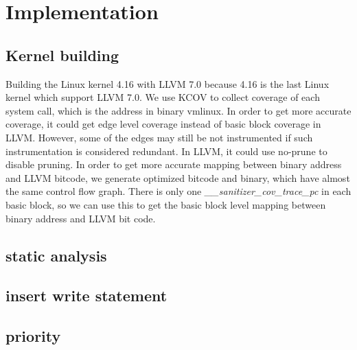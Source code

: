 \section{Implementation}

\subsection{Kernel building}


Building the Linux kernel 4.16 with LLVM 7.0 because 4.16 is the last Linux kernel which support LLVM 7.0.
We use KCOV to collect coverage of each system call,  which is the address in binary vmlinux.
In order to get more accurate coverage, it could get edge level coverage instead of basic block coverage in LLVM.
However, some of the edges may still be not instrumented if such instrumentation is considered redundant.
In LLVM, it could use no-prune to disable pruning.
In order to get more accurate mapping between binary address and LLVM bitcode, we generate optimized bitcode and binary, which have almost the same control flow graph.
There is only one \textit{\_\_sanitizer\_cov\_trace\_pc} in each basic block, so we can use this to get the basic block level  mapping between binary address and LLVM bit code.


\subsection{static analysis}


\subsection{insert write statement}

\subsection{priority}